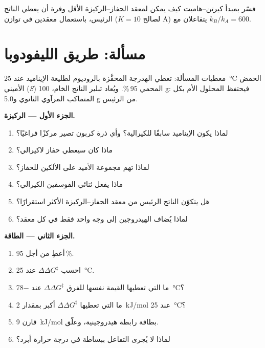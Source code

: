 \begin{exercise}[$\star\star\star$]\label{exo:b3:asymmetric-synthesis:12}
فسّر بمبدأ كيرتن--هاميت كيف يمكن لمعقد الحفاز--الركيزة الأقل وفرة
أن يعطي الناتج الرئيس، باستعمال معقدين في توازن
($K = 10$ لصالح A) يتفاعلان مع $k_B/k_A = 600$.
\end{exercise}

\section{مسألة: طريق الليفودوبا}

\begin{problem}
\label{pb:b3:asymmetric-synthesis:1}
معطيات المسألة: تعطي الهدرجة المحفَّزة بالروديوم لطليعة الإيناميد
عند \qty{25}{\celsius} الحمض الأميني (\textit{S}) المحمي  95\,\%. ويُعاد تبلير الناتج
الخام، 100 g: فيحتفظ المحلول الأم بكل المتماكب المرآوي الثانوي
و5.0 g من الرئيس.

\medskip\noindent\textbf{الجزء الأول --- الركيزة.}
\begin{enumerate}
  \item لماذا يكون الإيناميد سابقًا للكيرالية؟ وأي ذرة كربون تصير مركزًا فراغيًا؟
  \item ماذا كان سيعطي حفاز لاكيرالي؟
  \item لماذا تهم مجموعة الأميد على الألكين للحفاز؟
  \item ماذا يفعل ثنائي الفوسفين الكيرالي؟
  \item هل يتكوّن الناتج الرئيس من معقد الحفاز--الركيزة
        الأكثر استقرارًا؟
  \item لماذا يُضاف الهيدروجين إلى وجه واحد فقط في كل معقد؟
\end{enumerate}

\medskip\noindent\textbf{الجزء الثاني --- الطاقة.}
\begin{enumerate}[resume]
  \item أعطِ  من أجل  95\,\%.
  \item احسب $\Delta\Delta G^\ddagger$ عند \qty{25}{\celsius}.
  \item ما  التي تعطيها القيمة نفسها للفرق $\Delta\Delta G^\ddagger$ عند \qty{-78}{\celsius}؟
  \item ما  التي تعطيها $\Delta\Delta G^\ddagger$ أكبر بمقدار \qty{2}{kJ/mol} عند \qty{25}{\celsius}؟
  \item قارن \qty{9}{kJ/mol} بطاقة رابطة هيدروجينية، وعلّق.
  \item لماذا لا يُجرى التفاعل ببساطة في درجة حرارة أبرد؟
\end{enumerate}


\end{problem}
